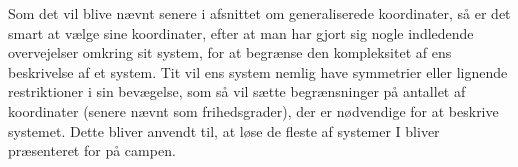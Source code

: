 
Som det vil blive nævnt senere i afsnittet om generaliserede koordinater, så er det smart at vælge sine koordinater, efter at man har gjort sig nogle indledende overvejelser omkring sit system, for at begrænse den kompleksitet af ens beskrivelse af et system. Tit vil ens system nemlig have symmetrier eller lignende restriktioner i sin bevægelse, som så vil sætte begrænsninger på antallet af koordinater (senere nævnt som frihedsgrader), der er nødvendige for at beskrive systemet. Dette bliver anvendt til, at løse de fleste af systemer I bliver præsenteret for på campen.%

